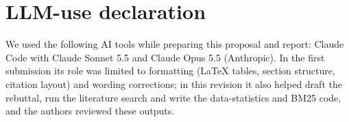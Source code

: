 \documentclass[11pt]{article}
\begin{document}
\section{LLM-use declaration}
\label{sec:llm}
We used the following AI tools while preparing this proposal and report: Claude Code with Claude Sonnet 5.5 and Claude Opus 5.5 (Anthropic).
In the first submission its role was limited to formatting (LaTeX tables, section structure, citation layout) and wording corrections; in this revision it also helped draft the rebuttal, run the literature search and write the data-statistics and BM25 code, and the authors reviewed these outputs.



\end{document}
